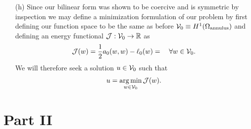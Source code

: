 \documentclass{article}
\begin{document}
\begin{itemize}
	\item[(h)]	Since our bilinear form was shown to be coercive and is symmetric by inspection we may define a minimization formulation of our problem by first defining our function space to be the same as before \(\mathcal{V}_0 \equiv H^1(\Omega_\text{annulus}) \) and defining an energy functional \(\mathcal{J} : \mathcal{V}_0 \to \mathbb{R} \) as
	\begin{equation}
		\mathcal{J}(w) = \dfrac{1}{2}a_0(w,w) - \ell_0(w) =  \quad \forall w \in \mathcal{V}_0.
	\end{equation}
	We will therefore seek a solution \(u \in \mathcal{V}_0 \) such that 
	\begin{equation}
		u = \operatorname*{arg\,min}\limits_{w\in\mathcal{V}_0} \mathcal{J}(w).
	\end{equation}
	
\end{itemize}

\section*{Part II}
\end{document}
